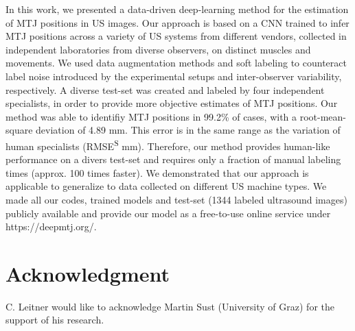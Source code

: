 \documentclass[journal,twoside,web]{ieeecolor}
\begin{document}
In this work, we presented a data-driven deep-learning method for the estimation of MTJ positions in US images. Our approach is based on a CNN trained to infer MTJ positions across a variety of US systems from different vendors, collected in independent laboratories from diverse observers, on distinct muscles and movements. We used data augmentation methods and soft labeling to counteract label noise introduced by the experimental setups and inter-observer variability, respectively. A diverse test-set was created and labeled by four independent specialists, in order to provide more objective estimates of MTJ positions. Our method was able to identifiy MTJ positions in 99.2\% of cases, with a root-mean-square deviation of 4.89 mm. 
This error is in the same range as the variation of human specialists (RMSE\textsuperscript{S} mm). Therefore, our method provides human-like performance on a divers test-set and requires only a fraction of manual labeling times (approx. 100 times faster). We demonstrated that our approach is applicable to generalize to data collected on different US machine types. We made all our codes, trained models and test-set (1344 labeled ultrasound images) publicly available and provide our model as a free-to-use online service under https://deepmtj.org/. 
\appendices
\section*{Acknowledgment}
C. Leitner would like to acknowledge Martin Sust (University of Graz) for the support of his research.
\end{document}
